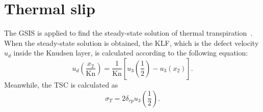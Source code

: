 \section{Thermal slip}



The GSIS is applied to find the steady-state solution of thermal transpiration~\cite{Wang2020PoF,Su2021CMAME}. When the steady-state solution is obtained, the KLF, which is the defect velocity $u_d$ inside the Knudsen layer, is calculated according to the following equation:
\begin{equation}
u_d\left(\frac{x_2}{\text{Kn}}\right)=\frac{1}{\text{Kn}}\left[u_3\left(\frac{1}{2}\right)-u_3(x_2)\right].
\end{equation} 
Meanwhile, the TSC is calculated as
\begin{equation}
\sigma_T=2\delta_{rp}u_3\left(\frac{1}{2}\right).
\end{equation}






